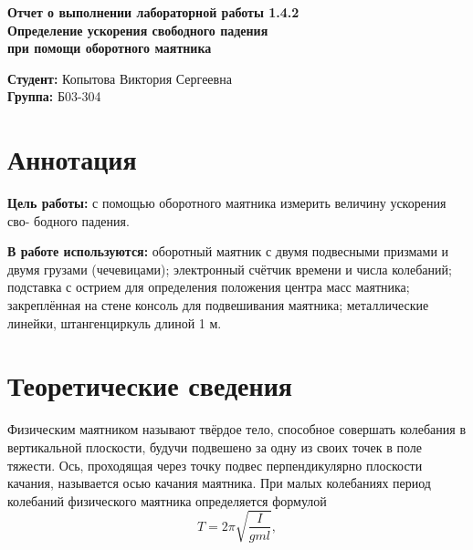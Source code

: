 \documentclass[a4paper,12 pt]{article}
\begin{document}
    \begin{titlepage}
    \begin{center}
        \vspace{4cm}
        \huge {\textbf{Отчет о выполнении лабораторной работы 1.4.2 }}
        {} \\
        \vspace{1cm}
        \Large {\textbf{Определение ускорения свободного падения}} \\
        \Large {\textbf{при помощи оборотного маятника}} \\
        \vspace{10cm}
        \begin{flushright}
        \begin{minipage}{.45\textwidth}
        \normalsize{\textbf{Студент:} Копытова Виктория Сергеевна}\\
        \textbf{Группа:} Б03-304\\
        \end{minipage}
        \end{flushright}   
    \end{center}
    \end{titlepage}
\newpage
 
\section{Аннотация}
\textbf{Цель работы:} с помощью оборотного маятника измерить величину ускорения сво-
бодного падения.
	
\textbf{В работе используются:} оборотный маятник с двумя подвесными призмами и
двумя грузами (чечевицами); электронный счётчик времени и числа колебаний;
подставка с острием для определения положения центра масс маятника; закреплённая на стене консоль для подвешивания маятника; металлические линейки, штангенциркуль длиной 1 м.

\section{Теоретические сведения}

Физическим маятником называют твёрдое тело, способное совершать
колебания в вертикальной плоскости, будучи подвешено за одну из своих
точек в поле тяжести. Ось, проходящая через точку подвес перпендикулярно плоскости качания, называется осью качания маятника.
При малых колебаниях период колебаний физического маятника определяется формулой
\begin{equation}
    T=2\pi \sqrt{\frac{I}{gml}},
\end{equation}
\end{document}
